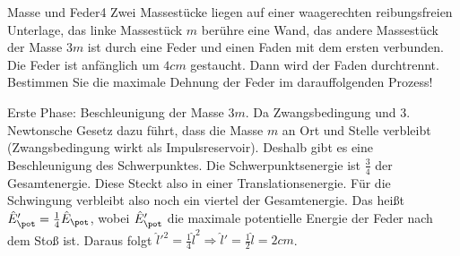\begin{problem}{Masse und Feder}{4}
  Zwei Massestücke liegen auf einer waagerechten reibungsfreien Unterlage, das linke Massestück $m$ berühre eine Wand, das andere Massestück der Masse $3m$ ist durch eine Feder und einen Faden mit dem ersten verbunden.  Die Feder ist anfänglich um $4\unit{cm}$ gestaucht.  Dann wird der Faden durchtrennt.  Bestimmen Sie die maximale Dehnung der Feder im darauffolgenden Prozess!
  \begin{solution}
    Erste Phase:  Beschleunigung der Masse $3m$.  Da Zwangsbedingung und 3. Newtonsche Gesetz dazu führt, dass die Masse $m$ an Ort und Stelle verbleibt (Zwangsbedingung wirkt als Impulsreservoir).  Deshalb gibt es eine Beschleunigung des Schwerpunktes.  Die Schwerpunktsenergie ist $\frac 34$ der Gesamtenergie.  Diese Steckt also in einer Translationsenergie.  Für die Schwingung verbleibt also noch ein viertel der Gesamtenergie.  Das heißt $\hat{E}_{\pot}'=\frac 14\hat{E}_{\pot}$, wobei $\hat{E}_\pot'$ die maximale potentielle Energie der Feder nach dem Stoß ist.  Daraus folgt $\hat{l}'^2=\frac 14\hat{l}^2\Rightarrow \hat{l}'=\frac 12 \hat l=2\unit{cm}$.
  \end{solution}
\end{problem}

